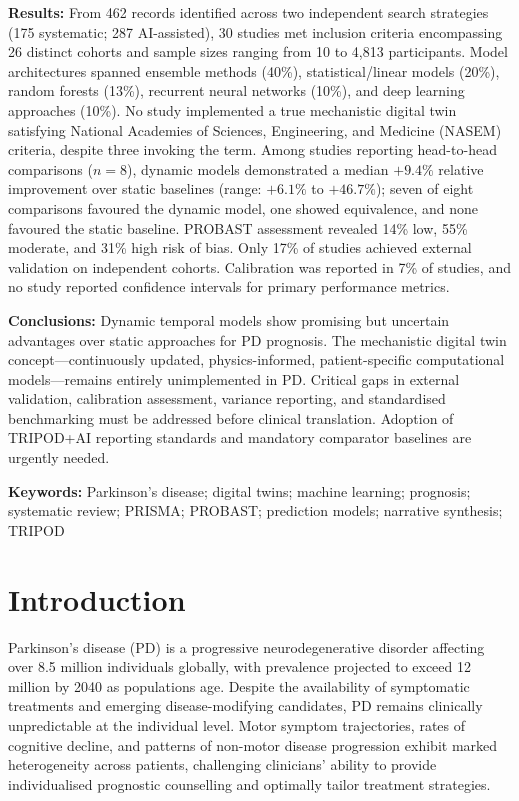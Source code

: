 \documentclass[11pt,a4paper]{article}
\begin{document}
\noindent\textbf{Results:}
From 462 records identified across two independent search strategies (175 systematic; 287 AI-assisted), 30 studies met inclusion criteria encompassing 26 distinct cohorts and sample sizes ranging from 10 to 4,813 participants. Model architectures spanned ensemble methods (40\%), statistical/linear models (20\%), random forests (13\%), recurrent neural networks (10\%), and deep learning approaches (10\%). No study implemented a true mechanistic digital twin satisfying National Academies of Sciences, Engineering, and Medicine (NASEM) criteria, despite three invoking the term. Among studies reporting head-to-head comparisons ($n=8$), dynamic models demonstrated a median $+9.4\%$ relative improvement over static baselines (range: $+6.1\%$ to $+46.7\%$); seven of eight comparisons favoured the dynamic model, one showed equivalence, and none favoured the static baseline. PROBAST assessment revealed 14\% low, 55\% moderate, and 31\% high risk of bias. Only 17\% of studies achieved external validation on independent cohorts. Calibration was reported in 7\% of studies, and no study reported confidence intervals for primary performance metrics.

\noindent\textbf{Conclusions:}
Dynamic temporal models show promising but uncertain advantages over static approaches for PD prognosis. The mechanistic digital twin concept---continuously updated, physics-informed, patient-specific computational models---remains entirely unimplemented in PD. Critical gaps in external validation, calibration assessment, variance reporting, and standardised benchmarking must be addressed before clinical translation. Adoption of TRIPOD+AI reporting standards and mandatory comparator baselines are urgently needed.

\vspace{0.3cm}
\noindent\textbf{Keywords:} Parkinson's disease; digital twins; machine learning; prognosis; systematic review; PRISMA; PROBAST; prediction models; narrative synthesis; TRIPOD

\section{Introduction}

Parkinson's disease (PD) is a progressive neurodegenerative disorder affecting over 8.5 million individuals globally, with prevalence projected to exceed 12 million by 2040 as populations age\cite{dorsey2018}. Despite the availability of symptomatic treatments and emerging disease-modifying candidates, PD remains clinically unpredictable at the individual level. Motor symptom trajectories, rates of cognitive decline, and patterns of non-motor disease progression exhibit marked heterogeneity across patients, challenging clinicians' ability to provide individualised prognostic counselling and optimally tailor treatment strategies\cite{kalia2015,tolosa2021}.
\end{document}
